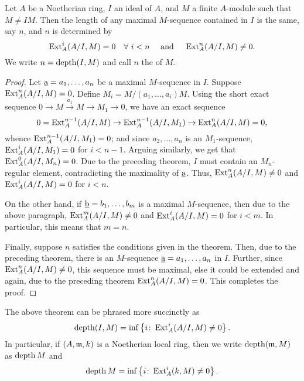 \begin{theorem}
    Let $A$ be a Noetherian ring, $I$ an ideal of $A$, and $M$ a finite $A$-module such that $M\ne IM$. Then the length of any maximal $M$-sequence contained in $I$ is the same, say $n$, and $n$ is determined by 
    \begin{equation*}
        \operatorname{Ext}^i_A(A/I, M) = 0 \quad\forall~i < n\quad\text{ and }\quad\operatorname{Ext}^n_A(A/I, M)\ne 0.
    \end{equation*}
    We write $n = \operatorname{depth}(I, M)$ and call $n$ the  of $M$.
\end{theorem}
\begin{proof}
    Let $\underbar{a} = a_1,\dots,a_n$ be a maximal $M$-sequence in $I$. Suppose $\operatorname{Ext}^n_A(A/I, M) = 0$. Define $M_i = M/(a_1,\dots,a_i)M$. Using the short exact sequence $0\to M\xrightarrow{a_1} M\to M_1\to 0$, we have an exact sequence
    \begin{equation*}
        0 = \operatorname{Ext}^{n - 1}_A(A/I, M)\to \operatorname{Ext}^{n - 1}_A(A/I, M_1)\to\operatorname{Ext}^{n}_A(A/I, M) = 0,
    \end{equation*}
    whence $\operatorname{Ext}^{n - 1}_A(A/I, M_1) = 0$; and since $a_2,\dots,a_n$ is an $M_1$-sequence, $\operatorname{Ext}^{i}_A(A/I, M_1) = 0$ for $i < n - 1$. Arguing similarly, we get that $\operatorname{Ext}^0_A(A/I, M_n) = 0$. Due to the preceding theorem, $I$ must contain an $M_n$-regular element, contradicting the maximality of $\underbar{a}$. Thus, $\operatorname{Ext}^n_A(A/I, M) \ne 0$ and $\operatorname{Ext}^{i}_A(A/I, M) = 0$ for $i < n$.

    On the other hand, if $\underbar{b} = b_1,\dots,b_m$ is a maximal $M$-sequence, then due to the above paragraph, $\operatorname{Ext}^m_A(A/I, M)\ne 0$ and $\operatorname{Ext}^i_A(A/I, M) = 0$ for $i < m$. In particular, this means that $m = n$.

    Finally, suppose $n$ satisfies the conditions given in the theorem. Then, due to the preceding theorem, there is an $M$-sequence $\underbar{a} = a_1,\dots,a_n$ in $I$. Further, since $\operatorname{Ext}^n_A(A/I, M)\ne 0$, this sequence must be maximal, else it could be extended and again, due to the preceding theorem $\operatorname{Ext}^n_A(A/I, M) = 0$. This completes the proof.
\end{proof}

\begin{remark}
    The above theorem can be phrased more succinctly as 
    \begin{equation*}
        \operatorname{depth}(I, M) = \inf\left\{i\colon\operatorname{Ext}^i_A(A/I, M)\ne 0\right\}.
    \end{equation*}
    In particular, if $(A,\mathfrak{m}, k)$ is a Noetherian local ring, then we write $\operatorname{depth}(\mathfrak{m}, M)$ as $\operatorname{depth} M$ and 
    \begin{equation*}
        \operatorname{depth} M = \inf\left\{i\colon\operatorname{Ext}^i_A(k, M)\ne 0\right\}.
    \end{equation*}
\end{remark}

